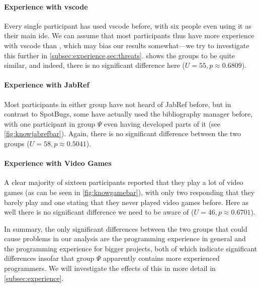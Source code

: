 \documentclass[../thesis]{subfiles}
\begin{document}
\paragraph{Experience with \gls{vscode}}
Every single participant has used \gls{vscode} before, with six people even using it as their main \gls{ide}.
We can assume that most participants thus have more experience with \gls{vscode} than \SEE{}, which may bias our results somewhat---we try to investigate this further in \cref{subsec:experience,sec:threats}.
 shows the groups to be quite similar, and indeed, there is no significant difference here ($U = 55, p \approx 0.6809$).

\paragraph{Experience with JabRef}
Most participants in either group have not heard of JabRef before, but in contrast to SpotBugs, some have actually used the bibliography manager before, with one participant in group $\Psi$ even having developed parts of it (see \cref{fig:knowjabrefbar}).
Again, there is no significant difference between the two groups ($U = 58, p \approx 0.5041$).

\paragraph{Experience with Video Games}
A clear majority of sixteen participants reported that they play a lot of video games (as can be seen in \cref{fig:knowgamebar}), with only two responding that they barely play and one stating that they never played video games before.
Here as well there is no significant difference we need to be aware of ($U = 46, p \approx 0.6701$).

In summary, the only significant differences between the two groups that could cause problems in our analysis are the programming experience in general and the programming experience for bigger projects, both of which indicate significant differences insofar that group $\Psi$ apparently contains more experienced programmers.
We will investigate the effects of this in more detail in \cref{subsec:experience}.

%
%
\end{document}
